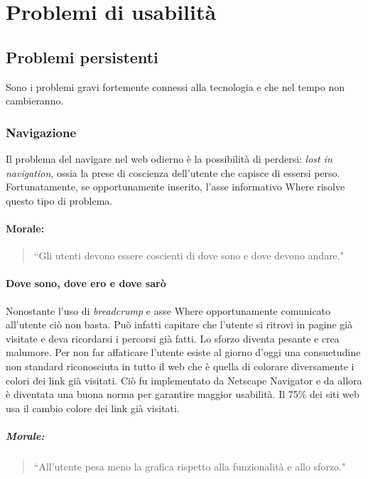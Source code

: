 
\section{Problemi di usabilità}

	\subsection{Problemi persistenti}
		Sono i problemi gravi fortemente connessi alla tecnologia e che nel tempo non cambieranno.
	
		\subsubsection{Navigazione}
			Il problema del navigare nel web odierno è la possibilità di perdersi: \emph{lost in navigation}, ossia la prese di coscienza dell'utente che capisce di essersi perso. Fortunatamente, se opportunamente inserito, l'asse informativo Where risolve questo tipo di problema.
			\paragraph*{Morale:}
			\begin{quote}
				``Gli utenti devono essere coscienti di dove sono e dove devono andare."
			\end{quote}
			
			\paragraph{Dove sono, dove ero e dove sarò}
				Nonostante l'uso di \emph{breadcrump} e asse Where opportunamente comunicato all'utente ciò non basta. Può infatti capitare che l'utente si ritrovi in pagine già visitate e deva ricordarsi i percorsi già fatti. Lo sforzo diventa pesante e crea malumore. Per non far affaticare l'utente esiste al giorno d'oggi una consuetudine non standard riconosciuta in tutto il web che è quella di colorare diversamente i colori dei link già visitati. Ciò fu implementato da Netscape Navigator e da allora è diventata una buona norma per garantire maggior usabilità.
				Il 75\% dei siti web usa il cambio colore dei link già visitati.
			\subparagraph*{Morale:}
			\begin{quote}
				``All'utente pesa meno la grafica rispetto alla funzionalità e allo sforzo."
			\end{quote}	
			
